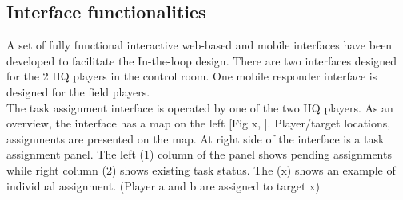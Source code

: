 



\subsection{Interface functionalities}
A set of fully functional interactive web-based and mobile interfaces have been developed to facilitate the In-the-loop design. There are two interfaces designed for the 2 HQ players in the control room. One mobile responder interface is designed for the field players. \\

The task assignment interface is operated by one of the two HQ players. As an overview, the interface has a map on the left [Fig x, ]. Player/target locations, assignments are presented on the map. At right side of the interface is a task assignment panel. The left (1) column of the panel shows pending assignments while right column (2) shows existing task status. The (x) shows an example of individual assignment. (Player a and b are assigned to target x)\\


